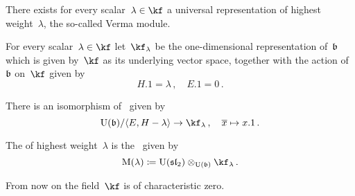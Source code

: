 \documentclass[a4paper, 11pt, oneside]{scrartcl}
\begin{document}
There exists for every scalar~$\lambda \in \kf$ a universal representation of highest weight~$\lambda$, the so-called Verma module. 

\begin{definition}
  For every scalar~$\lambda \in \kf$ let~$\kf_\lambda$ be the one-dimensional representation of~$\mathfrak{b}$ which is given by~$\kf$ as its underlying vector space, together with the action of~$\mathfrak{b}$ on~$\kf$ given by
  \[
    H.1 = \lambda \,,
    \quad
    E.1 = 0 \,.
  \]
\end{definition}

\begin{lemma}
  There is an isomorphism of~\modules{$\Univ(\blie)$} given by
  \[
    \Univ(\blie) / \gen{E, H - \lambda}
    \to
    \kf_\lambda \,,
    \quad
    \class{x}
    \mapsto
    x.1 \,.
  \]
\end{lemma}

\begin{definition}
  The  of highest weight~$\lambda$ is the~ given by
  \[
    \verma(\lambda)
    \defined
    \Univ(\sllie_2) \tensor_{\Univ(\blie)} \kf_\lambda \,.
  \]
\end{definition}

\begin{convention}
  From now on the field~$\kf$ is of characteristic zero.
\end{convention}
\end{document}
